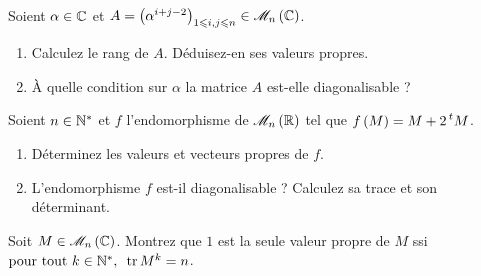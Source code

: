 \begin{corr}
\end{corr}

\begin{exo}
Soient \(\alpha\in\mathbb{C}\) et \(A=\paren{\alpha^{i+j-2}}_{1\leq i,j\leq n}\in\M{n}[\C]\).

\begin{enumerate}
    \item Calculez le rang de \(A\). Déduisez-en ses valeurs propres. \\
    \item À quelle condition sur \(\alpha\) la matrice \(A\) est-elle diagonalisable ?
\end{enumerate}
\end{exo}

\begin{corr}
\end{corr}

\begin{exo}
Soient \(n\in\mathbb{N}^*\) et \(f\) l'endomorphisme de \(\M{n}[\R]\) tel que \(f\left(M\right)=M+2\prescript{t}{}{M}\).

\begin{enumerate}
    \item Déterminez les valeurs et vecteurs propres de \(f\). \\
    \item L'endomorphisme \(f\) est-il diagonalisable ? Calculez sa trace et son déterminant.
\end{enumerate}
\end{exo}

\begin{corr}
\end{corr}

\begin{exo}
Soit \(M\in\M{n}[\C]\). Montrez que \(1\) est la seule valeur propre de \(M\) ssi \(\quantifs{\tpt k\in\Ns}\tr M^k=n\).
\end{exo}

\begin{corr}
\end{corr}

